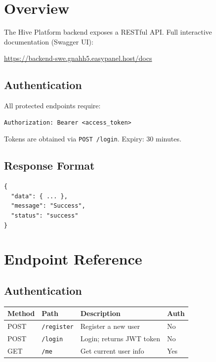 \documentclass[11pt,a4paper]{report}
\begin{document}
\section{Overview}

The Hive Platform backend exposes a RESTful API. Full interactive documentation (Swagger UI):
\begin{center}
    \url{https://backend-swe.gnahh5.easypanel.host/docs}
\end{center}

\subsection{Authentication}

All protected endpoints require:
\begin{lstlisting}
Authorization: Bearer <access_token>
\end{lstlisting}
Tokens are obtained via \texttt{POST /login}. Expiry: 30 minutes.

\subsection{Response Format}

\begin{lstlisting}
{
  "data": { ... },
  "message": "Success",
  "status": "success"
}
\end{lstlisting}

\section{Endpoint Reference}

\subsection{Authentication}

\begin{longtable}{|l|p{6.5cm}|p{5cm}|l|}
    \hline
    \textbf{Method} & \textbf{Path}      & \textbf{Description}     & \textbf{Auth} \\
    \hline
    \endhead
    POST            & \texttt{/register} & Register a new user      & No            \\
    \hline
    POST            & \texttt{/login}    & Login; returns JWT token & No            \\
    \hline
    GET             & \texttt{/me}       & Get current user info    & Yes           \\
    \hline
\end{longtable}
\end{document}
